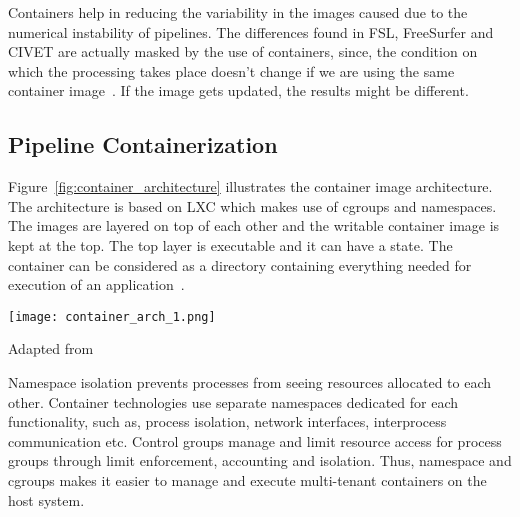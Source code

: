 Containers help in reducing the variability in the images caused due to the numerical instability of pipelines. The differences found in FSL, FreeSurfer and CIVET are actually masked by the use of containers, since, the condition on which the processing takes place doesn't change if we are using the same container image~\cite{Gla15}. If the image gets updated, the results might be different.




\subsection{Pipeline Containerization}
Figure~\ref{fig:container_architecture} illustrates the container image 
architecture. %
The architecture is based on LXC which makes use of cgroups and namespaces. The images are layered 
on top of each other and the writable container image is kept at the 
top. The top layer is executable and it can have a state. The container 
can be considered as a directory containing everything needed for 
execution of an application~\cite{7158965}.\\

\begin{center}
\texttt{[image: container\_arch\_1.png]}
\caption*{Adapted from \cite{7158965}}
\label{fig:container_architecture}
\end{center}

Namespace isolation prevents processes from seeing resources allocated to each other. Container technologies use separate namespaces dedicated for each functionality, such as, process isolation, network interfaces, interprocess communication etc. Control groups manage and limit resource access for process groups through limit enforcement, accounting and isolation. Thus, namespace and cgroups makes it easier to manage and execute multi-tenant containers on the host system.

